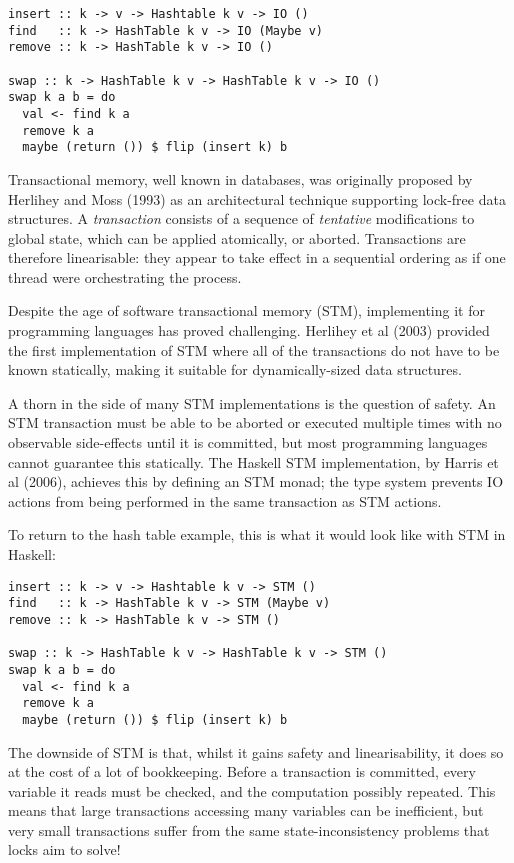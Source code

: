 \begin{verbatim}
insert :: k -> v -> Hashtable k v -> IO ()
find   :: k -> HashTable k v -> IO (Maybe v)
remove :: k -> HashTable k v -> IO ()

swap :: k -> HashTable k v -> HashTable k v -> IO ()
swap k a b = do
  val <- find k a
  remove k a
  maybe (return ()) $ flip (insert k) b
\end{verbatim}

Transactional memory, well known in databases, was originally proposed
by Herlihey and Moss (1993)\nocite{hardwaretm} as an architectural
technique supporting lock-free data structures. A \textit{transaction}
consists of a sequence of \textit{tentative} modifications to global
state, which can be applied atomically, or aborted. Transactions are
therefore linearisable: they appear to take effect in a sequential
ordering as if one thread were orchestrating the process.

Despite the age of software transactional memory (STM), implementing
it for programming languages has proved challenging. Herlihey et al
(2003)\nocite{dstm} provided the first implementation of STM where all
of the transactions do not have to be known statically, making it
suitable for dynamically-sized data structures.

A thorn in the side of many STM implementations is the question of
safety. An STM transaction must be able to be aborted or executed
multiple times with no observable side-effects until it is committed,
but most programming languages cannot guarantee this statically. The
Haskell STM implementation, by Harris et al (2006)\nocite{haskellstm},
achieves this by defining an STM monad; the type system prevents IO
actions from being performed in the same transaction as STM actions.

To return to the hash table example, this is what it would look like
with STM in Haskell:

\begin{verbatim}
insert :: k -> v -> Hashtable k v -> STM ()
find   :: k -> HashTable k v -> STM (Maybe v)
remove :: k -> HashTable k v -> STM ()

swap :: k -> HashTable k v -> HashTable k v -> STM ()
swap k a b = do
  val <- find k a
  remove k a
  maybe (return ()) $ flip (insert k) b
\end{verbatim}

The downside of STM is that, whilst it gains safety and
linearisability, it does so at the cost of a lot of
bookkeeping. Before a transaction is committed, every variable it
reads must be checked, and the computation possibly repeated. This
means that large transactions accessing many variables can be
inefficient, but very small transactions suffer from the same
state-inconsistency problems that locks aim to solve!

